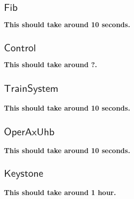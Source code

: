 \documentclass[runningheads]{llncs}
\begin{document}
\newcommand{\excommand}[1]{$\mathsf{#1}$}

\subsection{\excommand{Fib}}


\textbf{This should take around 10 seconds.}

\subsection{\excommand{Control}}


\textbf{This should take around ?.}

\subsection{\excommand{TrainSystem}}


\textbf{This should take around 10 seconds.}

\subsection{\excommand{OperAxUhb}}


\textbf{This should take around 10 seconds.}

\subsection{\excommand{Keystone}}


\textbf{This should take around 1 hour.}
\end{document}
